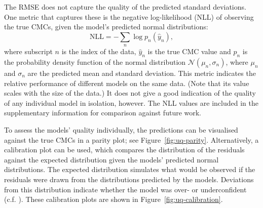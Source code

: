 The RMSE does not capture the quality of the predicted standard deviations. One metric that captures these is the negative log-likelihood (NLL) of observing the true CMCs, given the model's predicted normal distributions:
\begin{equation}
    \text{NLL} = -\sum_n \log p_n(\hat{y}_n),
\end{equation}
where subscript $n$ is the index of the data, $\hat{y}_n$ is the true CMC value and $p_n$ is the probability density function of the normal distribution $\mathcal{N}(\mu_n, \sigma_n)$, where $\mu_n$ and $\sigma_n$ are the predicted
mean and standard deviation. This metric indicates the relative performance of different models on the same data. (Note that its value scales with the size of the data.) It does not give a good indication of the quality of any individual
model in isolation, however. The NLL values are included in the supplementary information for comparison against future work.

To assess the models' quality individually, the predictions can be visualised against the true CMCs in a parity plot; see Figure~\ref{fig:uq-parity}. Alternatively, a calibration plot can be used, which compares the distribution of the residuals against the expected distribution given the models' predicted normal distributions. The expected distribution simulates what would be observed if the residuals were drawn from the distributions predicted by the models.
Deviations from this distribution indicate whether the model was over- or underconfident (c.f. \citet{tranMethodsComparingUncertainty2020}). These calibration plots are shown in Figure~\ref{fig:uq-calibration}.

